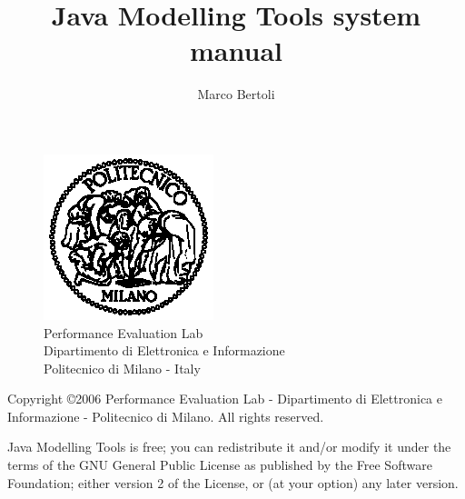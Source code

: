 \documentclass[10pt, twoside, a4paper]{book}
\author{Marco Bertoli}
\title{Java Modelling Tools system manual}
\begin{document}
\pagestyle{headings}  \setcounter{page}{-1}

\begin{titlepage}
\begin{figure}[h]
\begin{center}
\includegraphics{img/poli}\\
Performance Evaluation Lab\\
Dipartimento di Elettronica e Informazione\\
Politecnico di Milano - Italy
\end{center}
\end{figure}
\newlength{\centeroffset}
\setlength{\centeroffset}{-0.5\oddsidemargin}
\addtolength{\centeroffset}{0.5\evensidemargin}

\noindent\hspace*{\centeroffset}

\noindent\hspace*{\centeroffset}




\pagebreak
\begin{small}
  Copyright \copyright 2006 Performance Evaluation Lab - Dipartimento
  di Elettronica e Informazione - Politecnico di Milano.
  All rights reserved.

  Java Modelling Tools is free; you can redistribute it and/or modify it
  under the terms of the GNU General Public License as published by
  the Free Software Foundation; either version 2 of the License, or
  (at your option) any later version.


\end{small}
\end{titlepage}
\end{document}
